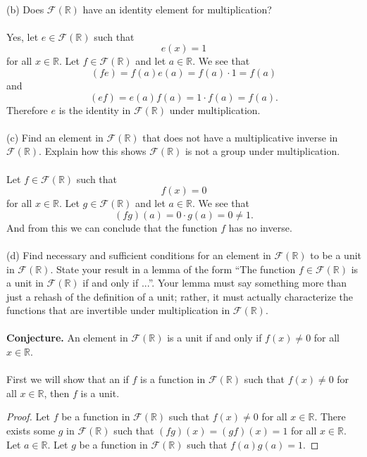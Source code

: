 \documentclass[11pt,a4paper]{article}
\begin{document}
~\\
(b) Does $\mathcal{F}(\mathbb{R})$ have an identity element for multiplication?\\
~\\
Yes, let $e\in\mathcal{F}(\mathbb{R})$ such that
\[e(x)=1\]
for all $x\in\mathbb{R}$. Let $f\in\mathcal{F}(\mathbb{R})$ and let $a\in\mathbb{R}$. We see that
\[(fe)=f(a)e(a)=f(a)\cdot 1=f(a)\]
and
\[(ef)=e(a)f(a)=1\cdot f(a)=f(a).\]
Therefore $e$ is the identity in $\mathcal{F}(\mathbb{R})$ under multiplication.\\
~\\
(c) Find an element in $\mathcal{F}(\mathbb{R})$ that does not have a multiplicative inverse in $\mathcal{F}(\mathbb{R})$. Explain how this shows $\mathcal{F}(\mathbb{R})$ is not a group under multiplication.\\
~\\
Let $f\in\mathcal{F}(\mathbb{R})$ such that
\[f(x)=0\]
for all $x\in\mathbb{R}$. Let $g\in\mathcal{F}(\mathbb{R})$ and let $a\in\mathbb{R}$. We see that
\[(fg)(a)=0\cdot g(a)=0\neq 1.\]
And from this we can conclude that the function $f$ has no inverse.\\
~\\
(d) Find necessary and sufficient conditions for an element in $\mathcal{F}(\mathbb{R})$ to be a unit in $\mathcal{F}(\mathbb{R})$. State your result in a lemma of the form ``The function $f\in\mathcal{F}(\mathbb{R})$ is a unit in $\mathcal{F}(\mathbb{R})$ if and only if ...''. Your lemma must say something more than just a rehash of the definition of a unit; rather, it must actually characterize the functions that are invertible under multiplication in $\mathcal{F}(\mathbb{R})$.\\
~\\
{\bf Conjecture.} An element in $\mathcal{F}(\mathbb{R})$ is a unit if and only if $f(x)\neq 0$ for all $x\in\mathbb{R}$.\\
~\\
First we will show that an if $f$ is a function in $\mathcal{F}(\mathbb{R})$ such that $f(x)\neq 0$ for all $x\in\mathbb{R}$, then $f$ is a unit.
\begin{proof}
Let $f$ be a function in $\mathcal{F}(\mathbb{R})$ such that $f(x)\neq 0$ for all $x\in\mathbb{R}$. There exists some $g$ in $\mathcal{F}(\mathbb{R})$ such that $(fg)(x) = (gf)(x)= 1$ for all $x\in\mathbb{R}$. Let $a\in\mathbb{R}$. Let $g$ be a function in $\mathcal{F}(\mathbb{R})$ such that $f(a)g(a) = 1$.
\end{proof}
~\\
\end{document}
